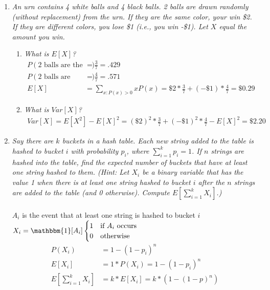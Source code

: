 \documentclass{article} %
\begin{document}
\thispagestyle{fancy} %

\begin{enumerate}
	
	\item \textit{An urn contains 4 white balls and 4 black balls. 2 balls are drawn randomly (without replacement) from the urn. If they are the same color, your win \$2. If they are different colors, you lose \$1 (i.e., you win -\$1). Let $X$ equal the amount you win.}
	
	\begin{enumerate}
		\item \textit{What is $E[X]$?}
		\begin{align*}
		P(\text{2 balls are the same color}) &= \frac{3}{7} = .429\\
		P(\text{2 balls are different colors}) &= \frac{4}{7} = .571\\
		E[X] &= \sum_{x:P(x)>0} xP(x) = \$2 * \frac{3}{7} + (-\$1) * \frac{4}{7} = \$0.29
		\end{align*}
		
		\item \textit{What is $Var[X]$?}
		\begin{align*}
		Var[X] = E[X^2] - E[X]^2 = (\$2)^2 * \frac{3}{7} + (-\$1)^2 * \frac{4}{7} - E[X]^2 = \$2.20
		\end{align*}
	
	\end{enumerate}	
	
	\item \textit{Say there are $k$ buckets in a hash table. Each new string added to the table is hashed to bucket $i$ with probability $p_i$, where $\sum_{i=1}^{k} p_i = 1$. If $n$ strings are hashed into the table, find the expected number of buckets that have at least one string hashed to them. (Hint: Let $X_i$ be a binary variable that has the value 1 when there is at least one string hashed to bucket $i$ after the $n$ strings are added to the table (and 0 otherwise). Compute $E[\sum_{i=1}^{k} X_i]$.)}\\
	\\
	$A_i$ is the event that at least one string is hashed to bucket $i$\\
	$X_i = \mathbbm{1}[A_i]
		\begin{cases}
		1 &\text{if } A_i \text{ occurs}\\
		0 &\text{otherwise}
		\end{cases}$
	\begin{align*}
	P(X_i) &= 1 - (1 - p_i)^n\\
	E[X_i] &= 1 * P(X_i) = 1 - (1 - p_i)^n\\
	E[\sum_{i=1}^{k} X_i] &= k * E[X_i] = k * (1 - (1 - p)^n)
	\end{align*}
	

\end{enumerate}
\end{document}
